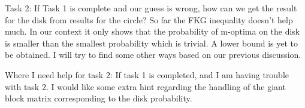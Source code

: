 \documentclass[10pt]{article}
\newenvironment{Proof of lemma}{\noindent{\bf Proof of Lemma}}{\hfill$\Box$\newline}
\newenvironment{Proof of claim}{\noindent{\bf Proof of claim}}{\hfill$\Box$\newline}
\newenvironment{Proof of theorem}{\noindent{\bf Proof of Theorem}}{\hfill\scriptsize{$\Box$}\newline}
\newenvironment{Proof of theorems}{\noindent{\bf Proof of Theorems}}{\hfill$\Box$\newline}
\newenvironment{Proof of proposition}{\noindent{\bf Proof of Proposition}}{\hfill$\Box$\newline}
\newenvironment{Proof of propositions}{\noindent{\bf Proof of Propositions}}{\hfill$\Box$\newline}
\newenvironment{Proof of exercise}{\noindent{\it Proof of Exercise:}}{\hfill$\Box$}
\begin{document}
Task 2: If Task 1 is complete and our guess is wrong, how can we get the result for the disk from results for the circle? So far the FKG inequality doesn't help much. In our context it only shows that the probability of m-optima on the disk is smaller than the smallest probability which is trivial. A lower bound is yet to be obtained. I will try to find some other ways based on our previous discussion.

Where I need help for task 2: If task 1 is completed, and I am having trouble with task 2. I would like some extra hint regarding the handling of the giant block matrix corresponding to the disk probability.
\end{document}
